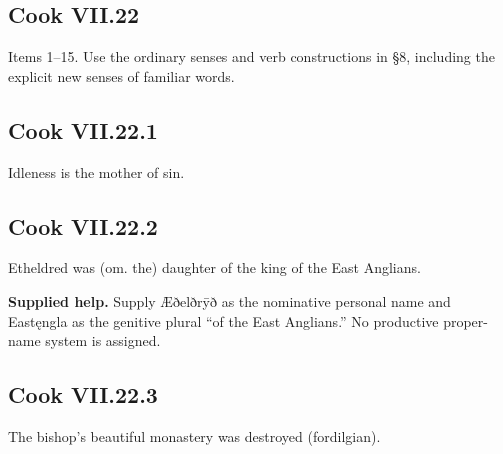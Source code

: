 \subsection*{Cook VII.22}

Items 1–15. Use the ordinary senses and verb constructions in §8, including the explicit new senses of familiar words.

\par\begin{minipage}{\linewidth}\raggedright
\subsection*{Cook VII.22.1}

Idleness is the mother of sin.

\end{minipage}\par\addvspace{4pt}

\par\begin{minipage}{\linewidth}\raggedright
\subsection*{Cook VII.22.2}

Etheldred was (om. the) daughter of the king of the East Anglians.

\end{minipage}\par\addvspace{4pt}

\textbf{Supplied help.} Supply Æðelðrȳð as the nominative personal name and Eastęngla as the genitive plural “of the East Anglians.” No productive proper-name system is assigned.

\par\begin{minipage}{\linewidth}\raggedright
\subsection*{Cook VII.22.3}

The bishop’s beautiful monastery was destroyed (fordilgian).

\end{minipage}\par\addvspace{4pt}

